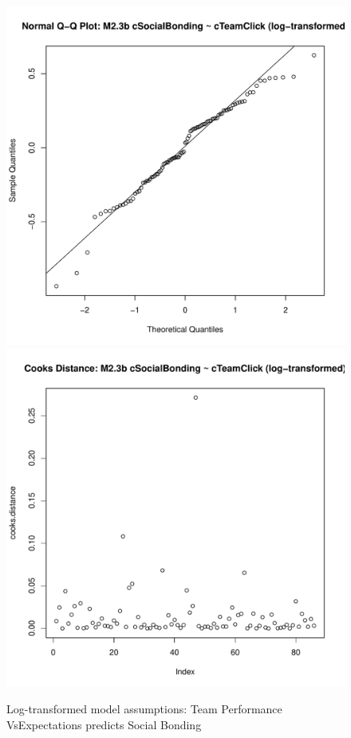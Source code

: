 \begin{figure}[htbp]
        \includegraphics[scale =.4]{images/MLM23bLogQQNorm.pdf}
        \includegraphics[scale =.4]{images/MLM23bLogCooksD.pdf}
        \caption{Log-transformed model assumptions: Team Performance VsExpectations predicts Social Bonding}
        \label{fig:MLM3bLogAssumptions}
      \end{figure}





